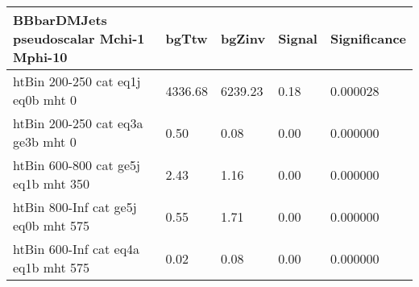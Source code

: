  \begin{tabular}{|l|l|l|l|l|}
\small
   \label{mostSensitiveBins_BBbarDMJets_pseudoscalar_Mchi-1_Mphi-10_25ns}
	\textbf{BBbarDMJets pseudoscalar Mchi-1 Mphi-10}	 & 	bgTtw	 & 	bgZinv	 & 	Signal &	 Significance \\ 
	\hline
	htBin 200-250 cat eq1j eq0b mht 0 & 	4336.68	 & 	6239.23	 & 	0.18 	&0.000028 \\ 
	htBin 200-250 cat eq3a ge3b mht 0 & 	0.50	 & 	0.08	 & 	0.00 	&0.000000 \\ 
	htBin 600-800 cat ge5j eq1b mht 350 & 	2.43	 & 	1.16	 & 	0.00 	&0.000000 \\ 
	htBin 800-Inf cat ge5j eq0b mht 575 & 	0.55	 & 	1.71	 & 	0.00 	&0.000000 \\ 
	htBin 600-Inf cat eq4a eq1b mht 575 & 	0.02	 & 	0.08	 & 	0.00 	&0.000000 \\ 
\end{tabular}

